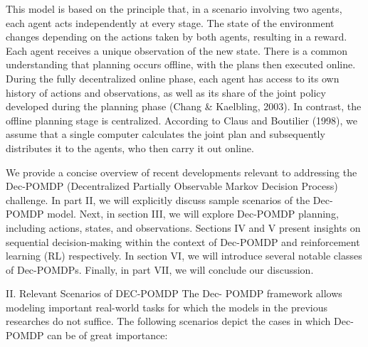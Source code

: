 This model is based on the principle that, in a scenario involving two agents, each agent acts independently at every stage. The state of the environment changes depending on the actions taken by both agents, resulting in a reward. Each agent receives a unique observation of the new state. There is a common understanding that planning occurs offline, with the plans then executed online. During the fully decentralized online phase, each agent has access to its own history of actions and observations, as well as its share of the joint policy developed during the planning phase (Chang & Kaelbling, 2003). In contrast, the offline planning stage is centralized. According to Claus and Boutilier (1998), we assume that a single computer calculates the joint plan and subsequently distributes it to the agents, who then carry it out online.

We provide a concise overview of recent developments relevant to addressing the Dec-POMDP (Decentralized Partially Observable Markov Decision Process) challenge. In part II, we will explicitly discuss sample scenarios of the Dec-POMDP model. Next, in section III, we will explore Dec-POMDP planning, including actions, states, and observations. Sections IV and V present insights on sequential decision-making within the context of Dec-POMDP and reinforcement learning (RL) respectively. In section VI, we will introduce several notable classes of Dec-POMDPs. Finally, in part VII, we will conclude our discussion.

II. Relevant Scenarios of DEC-POMDP
The Dec- POMDP framework allows modeling important real-world tasks for which the models in the previous researches do not suffice.  The following scenarios depict the cases in which Dec- POMDP can be of great importance:



